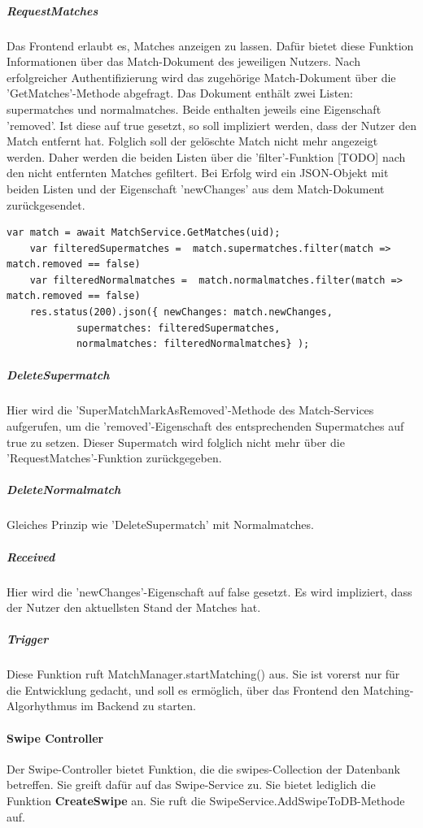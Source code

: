 \subparagraph{RequestMatches} 
Das Frontend erlaubt es, Matches anzeigen zu lassen. Dafür bietet diese Funktion Informationen über das Match-Dokument des jeweiligen Nutzers. Nach erfolgreicher Authentifizierung wird das zugehörige Match-Dokument über die 'GetMatches'-Methode abgefragt. Das Dokument enthält zwei Listen: supermatches und normalmatches. Beide enthalten jeweils eine Eigenschaft 'removed'. Ist diese auf true gesetzt, so soll impliziert werden, dass der Nutzer den Match entfernt hat. Folglich soll der gelöschte Match nicht mehr angezeigt werden. Daher werden die beiden Listen über die 'filter'-Funktion [TODO] nach den nicht entfernten Matches gefiltert. Bei Erfolg wird ein JSON-Objekt mit beiden Listen und der Eigenschaft 'newChanges' aus dem Match-Dokument zurückgesendet.
 
\begin{lstlisting}[caption=MatchController - RequestMatches, label=lst:matchcontrollerrequestmatches]
	var match = await MatchService.GetMatches(uid);
    var filteredSupermatches =  match.supermatches.filter(match => match.removed == false)
    var filteredNormalmatches =  match.normalmatches.filter(match => match.removed == false)
    res.status(200).json({ newChanges: match.newChanges,
            supermatches: filteredSupermatches, 
            normalmatches: filteredNormalmatches} );
\end{lstlisting}


\subparagraph{DeleteSupermatch} 
Hier wird die 'SuperMatchMarkAsRemoved'-Methode des Match-Services aufgerufen, um die 'removed'-Eigenschaft des entsprechenden Supermatches auf true zu setzen. Dieser Supermatch wird folglich nicht mehr über die 'RequestMatches'-Funktion zurückgegeben.

\subparagraph{DeleteNormalmatch} 
Gleiches Prinzip wie 'DeleteSupermatch' mit Normalmatches.

\subparagraph{Received} 
Hier wird die 'newChanges'-Eigenschaft auf false gesetzt. Es wird impliziert, dass der Nutzer den aktuellsten Stand der Matches hat.


\subparagraph{Trigger} 
Diese Funktion ruft MatchManager.startMatching() aus. Sie ist vorerst nur für die Entwicklung gedacht, und soll es ermöglich, über das Frontend den Matching-Algorhythmus im Backend zu starten.

%
%


\paragraph{Swipe Controller}
Der Swipe-Controller bietet Funktion, die die swipes-Collection der Datenbank betreffen. Sie greift dafür auf das Swipe-Service zu.
Sie bietet lediglich die Funktion \textbf{CreateSwipe} an. Sie ruft die SwipeService.AddSwipeToDB-Methode auf.